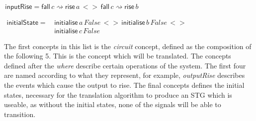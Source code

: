 \documentclass[british,compsoc]{IEEEtran}
\begin{document}
\begin{minipage}[t]{1\columnwidth}
\begin{flushleft}
$\,\mathsf{inputRise}=\mathsf{fall} \,c \rightsquigarrow \mathsf{rise} \,a \,<>\, \mathsf{fall} \,c\rightsquigarrow \mathsf{rise} \,b$
\par\end{flushleft}

\begin{flushleft}
$\begin{aligned}\mathsf{initialState}= & \, \mathsf{initialise}\,a \, False\,<>\,\mathsf{initialise}\,b \,False\,<> \\
 & \, \mathsf{initialise}\,c \,False \,
\end{aligned}
$
\par\end{flushleft}

\end{minipage}



The first concepts in this list is the \emph{circuit} concept, defined as the composition of the following 5. This is the concept which will be translated.
The concepts defined after the \emph{where} describe certain operations of the system. The first four are named according to what they represent,
for example, \textsf{\textit{\emph{outputRise}}} describes the events which cause the output to rise. The final concepts defines
the initial states, necessary for the translation algorithm to produce an STG which is useable, as without the initial states, none of the signals will be
able to transition.

\end{document}
